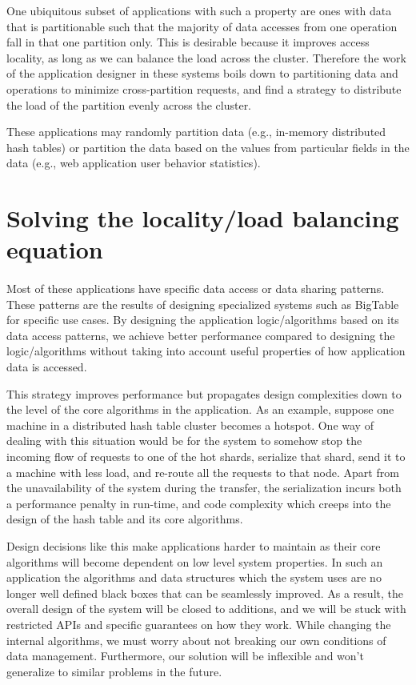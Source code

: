 One ubiquitous subset of applications with such a property are
ones with data that is partitionable such that the majority of data
accesses from one operation fall in that one partition only.
This is desirable because it improves access locality, as
long as we can balance the load across the cluster. Therefore the work of
the application designer in these systems boils down to partitioning data and
operations to minimize cross-partition requests, and find a strategy to
distribute the load of the partition evenly across the cluster.

These applications may randomly partition data (e.g., in-memory distributed
hash tables) or partition the data based on the values from particular fields
in the data (e.g., web application
user behavior statistics).


\section{Solving the locality/load balancing equation}
\paragraph{}
Most of these applications have specific data access or data sharing patterns.
These patterns are the results of designing specialized systems such as
BigTable \cite{chang2008bigtable} for specific use cases.
By designing the application logic/algorithms based on its data access patterns,
we achieve better performance compared
to designing the logic/algorithms without taking into account useful properties of
how application data is accessed.

This strategy improves performance but propagates design complexities
down to the level of the core algorithms in the application. As an example, suppose
one machine in a distributed hash table cluster becomes a hotspot.
One way of dealing with this situation would be for the system to somehow stop
the incoming flow of requests to one of the hot shards, serialize that shard,
send it to a machine with less load, and re-route all the requests to that node.
Apart from the unavailability of the system during the transfer, the
serialization incurs both a performance penalty in run-time, and code complexity
which creeps into the design of the hash table and its core algorithms.

Design decisions like this make applications harder to maintain as their
core algorithms will become dependent on low level system properties.
In such an application the algorithms and data structures which the system uses
are no longer well defined black boxes that can be seamlessly improved. As a
result, the overall design of the system will be closed to additions, and we
will be stuck with restricted APIs and specific guarantees on how they work.
While changing the internal algorithms, we must worry about not breaking our own
conditions of data management. Furthermore, our solution will be inflexible and
won't generalize to similar problems in the future.

